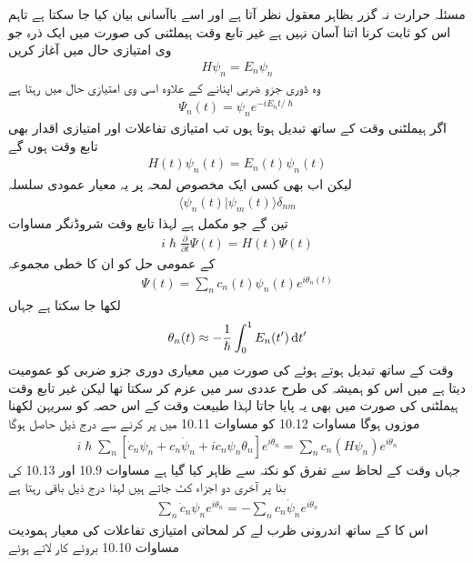 مسئلہ حرارت نہ گزر بظاہر معقول نظر آتا ہے اور اسے باآسانی بیان کیا جا سکتا ہے تاہم اس کو ثابت کرنا اتنا آسان نہیں ہے غیر تابع وقت ہيملٹنی کی صورت میں ایک ذرہ جو  وی امتیازی حال  میں آغاز کریں 
\begin{align}
H \psi_n = E_n \psi_n
\end{align}
 وہ ڈوری جزو ضربی اپنانے کے علاوہ اسی  وی امتیازی حال میں رہتا ہے 
\begin{align}
\Psi_n (t) = \psi_n e^{-i E_n t/ \hslash}
\end{align}
اگر ہيملٹنی وقت کے ساتھ تبدیل ہوتا ہوں تب امتیازی تفاعلات اور امتیازی اقدار بھی تابع وقت ہوں گے 
\begin{align}
H(t) \psi_n (t) = E_n (t) \psi_n (t)
\end{align}
لیکن اب بھی کسی ایک مخصوص لمحہ پر یہ معیار عمودی سلسلہ 
\begin{align}
\langle \psi_n (t) | \psi_m (t) \rangle \delta_{nm} 
\end{align}
تین گے جو مکمل ہے لہذا تابع وقت شروڈنگر مساوات 
\begin{align}
i \hslash \frac{\partial}{\partial t} \Psi (t) = H (t) \Psi (t)
\end{align}
کے عمومی حل کو ان کا خطی مجموعہ 
\begin{align}
\Psi (t) = \sum_n c_n (t) \psi_n (t) e^{i \theta_n (t)}
\end{align}
لکھا جا سکتا ہے جہاں 
\begin{align}
\theta_n (t) \approx - \frac{1}{\hslash} \int_0^1 E_n (t') \dif t'
\end{align}
وقت کے ساتھ تبدیل ہوتے ہوئے  کی صورت میں معیاری دوری جزو ضربی کو عمومیت دیتا ہے میں اس کو ہمیشہ کی طرح عددی سر  میں عزم کر سکتا تھا لیکن غیر تابع وقت ہيملٹنی کی صورت میں بھی یہ پایا جاتا لہذا طبیعت وقت کے اس حصہ کو سریہن لکھنا موزوں ہوگا مساوات 10.12 کو مساوات 10.11 میں پر کرنے سے درج ذیل حاصل ہوگا 
\begin{align}
i \hslash \sum_n [\dot{c}_n \psi_n + c_n \dot{\psi}_n + i c_n \psi_n \theta_n] e^{i \dot{\theta}_n} = \sum_n c_n (H \psi_n) e^{i \theta_n} 
\end{align}
جہاں وقت کے لحاظ سے تفرق کو نکتہ سے ظاہر کیا گیا ہے مساوات 10.9 اور 10.13 کی بنا پر آخری دو اجزاء کٹ جاتے ہیں لہذا درج ذیل باقی رہتا ہے 
\begin{align}
\sum_n \dot{c}_n \psi_n e^{i \theta_n} = - \sum_n c_n \dot{\psi}_n e^{i \theta_n}
\end{align}
اس کا  کے ساتھ اندرونی ظرب لے کر لمحاتی امتیازی تفاعلات کی معیار ہمودیت مساوات 10.10 بروئے کار لاتے ہوئے 
